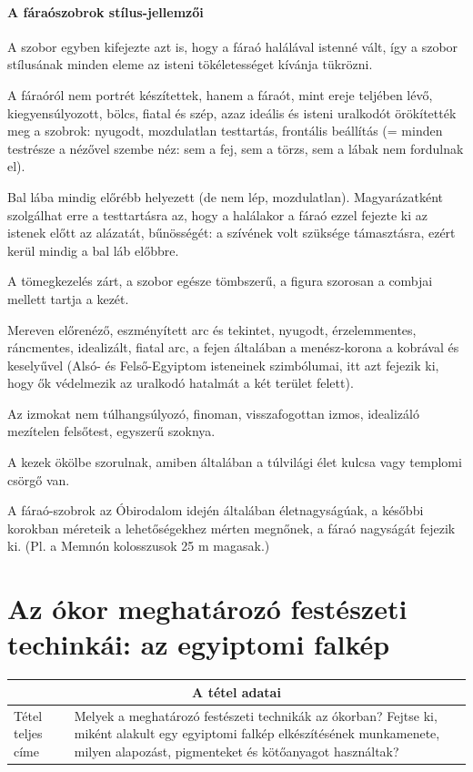 \paragraph{A fáraószobrok stílus-jellemzői}

A szobor egyben kifejezte azt is, hogy a fáraó halálával istenné vált, így a szobor stílusának minden eleme az isteni tökéletességet kívánja tükrözni.

A fáraóról nem portrét készítettek, hanem a fáraót, mint ereje teljében lévő, kiegyensúlyozott, bölcs, fiatal és szép, azaz ideális és isteni uralkodót örökítették meg a szobrok: nyugodt, mozdulatlan testtartás, frontális beállítás (= minden testrésze a nézővel szembe néz: sem a fej, sem a törzs, sem a lábak nem fordulnak el).

Bal lába mindig előrébb helyezett (de nem lép, mozdulatlan). Magyarázatként szolgálhat erre a testtartásra az, hogy a halálakor a fáraó ezzel fejezte ki az istenek előtt az alázatát, bűnösségét: a szívének volt szüksége támasztásra, ezért kerül mindig a bal láb előbbre.

A tömegkezelés zárt, a szobor egésze tömbszerű, a figura szorosan a combjai mellett tartja a kezét. 

Mereven előrenéző, eszményített arc és tekintet, nyugodt, érzelemmentes, ráncmentes, idealizált, fiatal arc, a fejen általában a menész-korona a kobrával és keselyűvel (Alsó- és Felső-Egyiptom isteneinek szimbólumai, itt azt fejezik ki, hogy ők védelmezik az uralkodó hatalmát a két terület felett).

Az izmokat nem túlhangsúlyozó, finoman, visszafogottan izmos, idealizáló mezítelen felsőtest, egyszerű szoknya.

A kezek ökölbe szorulnak, amiben általában a túlvilági élet kulcsa vagy templomi csörgő van. 

A fáraó-szobrok az Óbirodalom idején általában életnagyságúak, a későbbi korokban méreteik a lehetőségekhez mérten megnőnek, a fáraó nagyságát fejezik ki. (Pl. a Memnón kolosszusok 25 m magasak.)
	
\cleardoublepage

\section{Az ókor meghatározó festészeti techinkái: az egyiptomi falkép}

\begin{center}
	\begin{longtable}{ | m{} | p{} | }
		
		\hline
		\multicolumn{2}{|c|}{\textbf{A tétel adatai}}
		\\ \hline
		
		\hline
		Tétel teljes címe	
		 &
		 Melyek a meghatározó festészeti technikák az ókorban? Fejtse ki, miként alakult egy egyiptomi falkép elkészítésének munkamenete, milyen alapozást, pigmenteket és kötőanyagot használtak?
		\\ \hline
		
	\end{longtable}
\end{center}